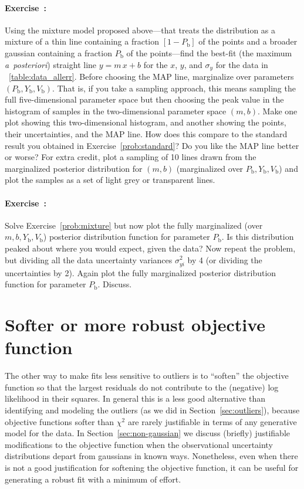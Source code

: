 \documentclass[12pt,twoside]{article}
\newcommand{\notenglish}[1]{\textsl{#1}}
\newcommand{\aposteriori}{\notenglish{a~posteriori}}
\newcommand{\sectionname}{Section}
\newcommand{\problemname}{Exercise}
\newcounter{problem}
\newenvironment{problem}{\paragraph{\problemname~\theproblem:}\refstepcounter{problem}}{}
\newcommand{\Pbad}{P_{\mathrm{b}}}
\newcommand{\Ybad}{Y_{\mathrm{b}}}
\newcommand{\Vbad}{V_{\mathrm{b}}}
\begin{document}
\begin{problem}\label{prob:mixture}
Using the mixture model proposed above---that treats the distribution
as a mixture of a thin line containing a fraction $[1-\Pbad]$ of the
points and a broader gaussian containing a fraction $\Pbad$ of the
points---find the best-fit (the maximum \aposteriori) straight line
$y=m\,x+b$ for the $x$, $y$, and $\sigma_y$ for the data in
\tablename~\ref{table:data_allerr}.  Before choosing the MAP line,
marginalize over parameters $(\Pbad,\Ybad,\Vbad)$.  That is, if you
take a sampling approach, this means sampling the full
five-dimensional parameter space but then choosing the peak value in
the histogram of samples in the two-dimensional parameter space
$(m,b)$.  Make one plot showing this two-dimensional histogram, and
another showing the points, their uncertainties, and the MAP line.
How does this compare to the standard result you obtained in
\problemname~\ref{prob:standard}?  Do you like the MAP line better or
worse?  For extra credit, plot a sampling of 10 lines drawn from the
marginalized posterior distribution for $(m,b)$ (marginalized over
$\Pbad,\Ybad,\Vbad$) and plot the samples as a set of light grey or
transparent lines.
\end{problem}

\begin{problem}\label{prob:badfraction}
Solve \problemname~\ref{prob:mixture} but now plot the fully
marginalized (over $m,b,\Ybad,\Vbad$) posterior distribution function
for parameter $\Pbad$.  Is this distribution peaked about where you
would expect, given the data?  Now repeat the problem, but dividing
all the data uncertainty variances $\sigma_{yi}^2$ by 4 (or dividing
the uncertainties by 2).  Again plot the fully marginalized posterior
distribution function for parameter $\Pbad$.  Discuss.
\end{problem}

\section{Softer or more robust objective function}\label{sec:robust}

The other way to make fits less sensitive to outliers is to ``soften''
the objective function so that the largest residuals do not contribute
to the (negative) log likelihood in their squares.  In general this is
a less good alternative than identifying and modeling the outliers (as
we did in \sectionname~\ref{sec:outliers}), because objective
functions softer than $\chi^2$ are rarely justifiable in terms of any
generative model for the data.  In \sectionname~\ref{sec:non-gaussian}
we discuss (briefly) justifiable modifications to the objective
function when the observational uncertainty distributions depart from
gaussians in known ways.  Nonetheless, even when there is not a good
justification for softening the objective function, it can be useful
for generating a robust fit with a minimum of effort.
\end{document}
